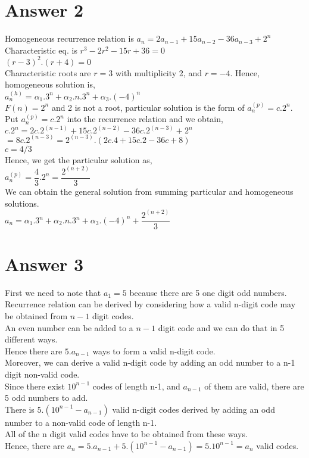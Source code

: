 \documentclass[11pt]{article}
\begin{document}
\section*{Answer 2}
Homogeneous recurrence relation is $a_n = 2a_{n-1}+15a_{n-2}-36a_{n-3}+2^n$ \\
 Characteristic eq. is $ r^3 - 2r^2 - 15r + 36 = 0$\\
 $ (r-3)^2 . (r+4) = 0$\\
Characteristic roots are $ r = 3$ with multiplicity 2, and $r = -4$. Hence, homogeneous solution is,\\
 $a_n^{(h)} = \alpha_1 .3^n + \alpha_2 .n.3^n + \alpha_3 .(-4)^n $\\
 $F(n) = 2^n$ and 2 is not a root, particular solution is the form of $a_n^{(p)} = c.2^n$. Put $a_n^{(p)} = c.2^n$ into the recurrence relation and we obtain,\\
 $c.2^n = 2c.2^{(n-1)} + 15c.2^{(n-2)} -36c.2^{(n-3)} + 2^n$\\
 $=8c.2^{(n-3)} = 2^{(n-3)}.(2c.4 + 15c.2 - 36c + 8)$\\
 $c = 4/3$\\
 Hence, we get the particular solution as,\\
 $a_n^{(p)} = \dfrac{4}{3}.2^n = \dfrac{2^{(n+2)}}{3}$\\
 We can obtain the general solution from summing particular and homogeneous solutions.\\
 $a_n = \alpha_1 .3^n + \alpha_2 .n.3^n + \alpha_3 .(-4)^n +  \dfrac{2^{(n+2)}}{3}$\\


\newpage
\section*{Answer 3}
First we need to note that $a_1 = 5$ because there are 5 one digit odd numbers. \\
Recurrence relation can be derived by considering how a valid n-digit code may be obtained from $n-1$ digit codes. \\
An even number can be added to a $n-1$ digit code and we can do that in 5 different ways. \\
Hence there are $5.a_{n-1}$ ways to form a valid n-digit code. \\
Moreover, we can derive a valid n-digit code by adding an odd number to a n-1 digit non-valid code. \\
Since there exist $10^{n-1}$ codes of length n-1, and $a_{n-1}$ of them are valid, there are 5 odd numbers to add. \\
There is $5.(10^{n-1} - a_{n-1}) $ valid n-digit codes derived by adding an odd number to a non-valid code of length n-1. \\
All of the n digit valid codes have to be obtained from these ways. \\
Hence, there are $a_n = 5.a_{n-1} + 5.(10^{n-1} - a_{n-1})= 5.10^{n-1}=a_n$ valid codes. \\
\end{document}
